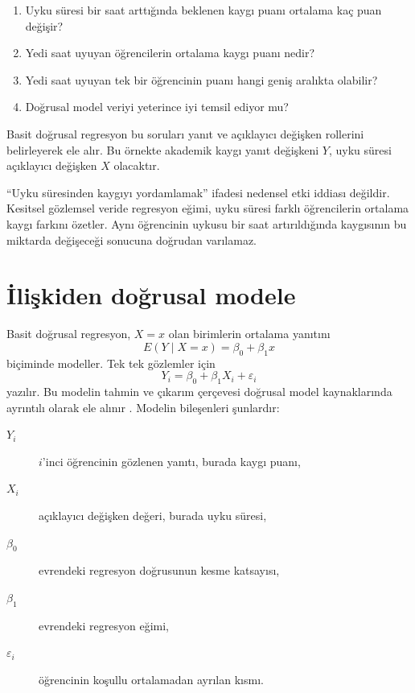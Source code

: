 \begin{enumerate}
  \item Uyku süresi bir saat arttığında beklenen kaygı puanı ortalama kaç puan değişir?
  \item Yedi saat uyuyan öğrencilerin ortalama kaygı puanı nedir?
  \item Yedi saat uyuyan tek bir öğrencinin puanı hangi geniş aralıkta olabilir?
  \item Doğrusal model veriyi yeterince iyi temsil ediyor mu?
\end{enumerate}

Basit doğrusal regresyon bu soruları yanıt ve açıklayıcı değişken rollerini
belirleyerek ele alır. Bu örnekte akademik kaygı yanıt değişkeni $Y$, uyku
süresi açıklayıcı değişken $X$ olacaktır.

\begin{researchbox}
``Uyku süresinden kaygıyı yordamlamak'' ifadesi nedensel etki iddiası değildir.
Kesitsel gözlemsel veride regresyon eğimi, uyku süresi farklı öğrencilerin
ortalama kaygı farkını özetler. Aynı öğrencinin uykusu bir saat artırıldığında
kaygısının bu miktarda değişeceği sonucuna doğrudan varılamaz.
\end{researchbox}

\section{İlişkiden doğrusal modele}

Basit doğrusal regresyon, $X=x$ olan birimlerin ortalama yanıtını
\[
E(Y\mid X=x)=\beta_0+\beta_1x
\]
biçiminde modeller. Tek tek gözlemler için
\[
Y_i=\beta_0+\beta_1X_i+\varepsilon_i
\]
yazılır. Bu modelin tahmin ve çıkarım çerçevesi doğrusal model kaynaklarında
ayrıntılı olarak ele alınır \cite{kutner2005}. Modelin bileşenleri şunlardır:

\begin{description}
  \item[$Y_i$] $i$'inci öğrencinin gözlenen yanıtı, burada kaygı puanı,
  \item[$X_i$] açıklayıcı değişken değeri, burada uyku süresi,
  \item[$\beta_0$] evrendeki regresyon doğrusunun kesme katsayısı,
  \item[$\beta_1$] evrendeki regresyon eğimi,
  \item[$\varepsilon_i$] öğrencinin koşullu ortalamadan ayrılan kısmı.
\end{description}

